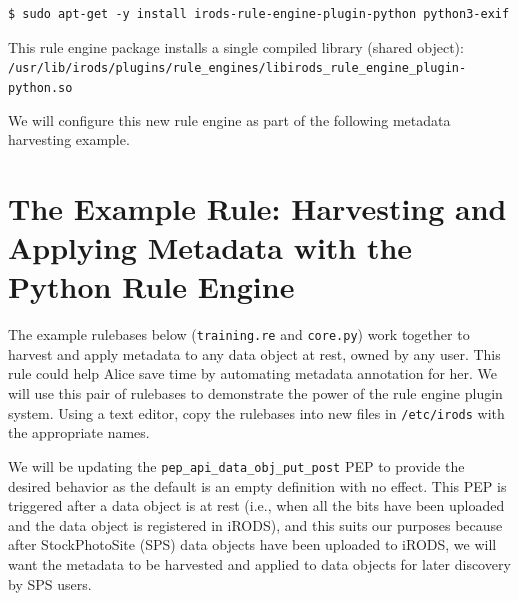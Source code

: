 \documentclass[10pt,oneside]{memoir}
\begin{document}
\begin{lstlisting}
$ sudo apt-get -y install irods-rule-engine-plugin-python python3-exif
\end{lstlisting}

This rule engine package installs a single compiled library (shared object): \\ \texttt{/usr/lib/irods/plugins/rule\_engines/libirods\_rule\_engine\_plugin-python.so}

We will configure this new rule engine as part of the following metadata harvesting example.

\section{The Example Rule: Harvesting and Applying Metadata with the Python Rule Engine}

The example rulebases below (\texttt{training.re} and \texttt{core.py}) work together to harvest and apply metadata to any data object at rest, owned by any user. This rule could help Alice save time by automating metadata annotation for her. We will use this pair of rulebases to demonstrate the power of the rule engine plugin system. Using a text editor, copy the rulebases into new files in \texttt{/etc/irods} with the appropriate names.

\vspace{5mm}
\begin{lrbox}{\lstTrainingRuleBase}

\end{lrbox}
\href{https://raw.githubusercontent.com/irods/irods_training/ugm2025/beginner/training.re}{\usebox{\lstTrainingRuleBase}}

\vspace{5mm}
\begin{lrbox}{\lstPythonRulebase}

\end{lrbox}
\href{https://raw.githubusercontent.com/irods/irods_training/ugm2025/beginner/core.py}{\usebox{\lstPythonRulebase}}

We will be updating the \texttt{pep\_api\_data\_obj\_put\_post} PEP to provide the desired behavior as the default is an empty definition with no effect.  This PEP is triggered after a data object is at rest (i.e., when all the bits have been uploaded and the data object is registered in iRODS), and this suits our purposes because after StockPhotoSite (SPS) data objects have been uploaded to iRODS, we will want the metadata to be harvested and applied to data objects for later discovery by SPS users.
\end{document}
